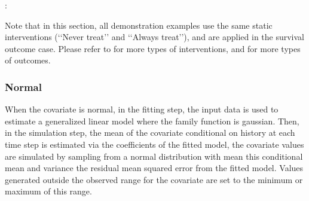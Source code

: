 \documentclass[letterpaper,10pt,english]{sphinxmanual}
\begin{document}
\begin{sphinxVerbatim}[commandchars=\\\{\}]
        
                  
               \PYG{p}{[} \PYG{p}{]}
               \PYG{p}{[} \PYG{p}{]}
              
              
               
\end{sphinxVerbatim}

\sphinxAtStartPar
{}:
\begin{quote}

\end{quote}

\sphinxAtStartPar
Note that in this section, all demonstration examples use the same static interventions
(‘‘Never treat’’ and ‘‘Always treat’’), and are applied in the survival outcome case.
Please refer to {\hyperref[\detokenize{Specifications/Interventions::doc}]{}} for more types of interventions,
and {\hyperref[\detokenize{Specifications/Outcome model::doc}]{}} for more types of outcomes.


\subsubsection{Normal}
\label{\detokenize{Specifications/Covariate models:normal}}
\sphinxAtStartPar
When the covariate is normal, in the fitting step, the input data is used to estimate a generalized linear model where
the family function is gaussian. Then, in the simulation step, the mean of the covariate conditional on history
at each time step is estimated via the coefficients of the fitted model, the covariate values are simulated
by sampling from a normal distribution with mean this conditional mean and variance the residual mean squared error
from the fitted model. Values generated outside the observed range for the covariate are set to the minimum or maximum of this range.
\end{document}
